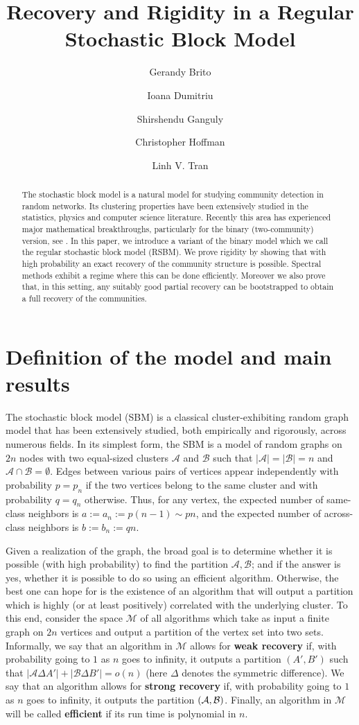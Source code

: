 \documentclass[11pt,reqno]{amsart}
\title{Recovery and Rigidity in a Regular Stochastic Block Model}
\author[Brito]{Gerandy Brito}
\author[Dumitriu]{Ioana Dumitriu}
\author[Ganguly]{Shirshendu Ganguly}
\author[Hoffman]{Christopher Hoffman}
\author[Tran]{Linh V. Tran}
\begin{document}
\maketitle
\begin{abstract}
The stochastic block model is a natural model for studying community detection in random networks.  Its clustering properties have been extensively studied in the statistics, physics and computer science literature.  Recently this area has experienced  major mathematical breakthroughs,  particularly for the binary  (two-community) version, see \cite{MNS12, MNS13, M13}.  
In this paper, we introduce a variant of the binary model which we call the regular stochastic block model (RSBM). We prove rigidity by showing that with high probability an exact recovery of the community structure is possible. Spectral methods exhibit a regime where this can be done efficiently. Moreover we also prove that, in this setting, any suitably good partial recovery can be bootstrapped to obtain a full recovery of the communities.
\end{abstract}


\section{Definition of the model and main results}
\label{definition}
The stochastic block model (SBM) is a classical cluster-exhibiting
random graph model that has been extensively studied, both empirically
and rigorously, across numerous fields. In its simplest form, the SBM
is a model of random graphs on $2n$ nodes with two equal-sized
clusters $\mathcal{A}$ and $\mathcal{B}$ such that
$|\mathcal{A}|=|\mathcal{B}|=n$ and $\mathcal{A} \cap \mathcal{B}
=\emptyset$. Edges between various pairs of vertices appear
independently with probability $p=p_n$ if the two vertices belong to the
same cluster and with probability $q=q_n$ otherwise.
Thus, for any vertex, the expected number of same-class neighbors is
$a:=a_n:=p (n-1) \sim pn$, and the expected number of across-class neighbors is
$b:=b_n:= q n$.

Given a realization of the graph, the broad goal is to determine
whether it is possible (with high probability) to find the partition
$\mathcal{A},\mathcal{B}$; and if the answer is yes, whether it is
possible to do so using an efficient algorithm. Otherwise, the best
one can hope for is the existence of an algorithm that will output a
partition which is highly  (or at least positively) correlated with
the underlying cluster. To this end, consider the space $\mathcal{M}$
of all algorithms which take as input a finite graph on $2n$ vertices and output a partition of the vertex set into two sets. 
Informally, we say that an algorithm in $\mathcal{M}$ allows for {\bf
  weak recovery} if, with probability going to $1$ as $n$ goes to infinity, it outputs a partition $(A',B')$ such that
$|\mathcal{A} \Delta A'|+|\mathcal{B} \Delta B'| =o(n)$  (here $\Delta$ denotes the symmetric difference).
We say that an algorithm allows for {\bf strong recovery} if, with
probability going to $1$ as $n$ goes to infinity, it outputs the
partition $(\mathcal{A},\mathcal{B})$. Finally, an algorithm in $\mathcal{M}$ will be called {\bf efficient} if its run time is polynomial in $n$.
\end{document}
